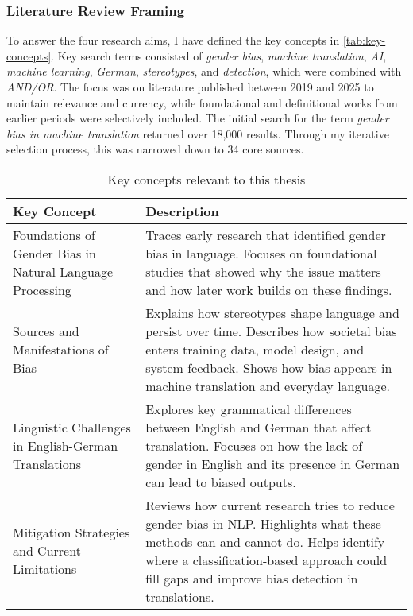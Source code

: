     \subsubsection{Literature Review Framing}
    To answer the four research aims, I have defined the key concepts in \autoref{tab:key-concepts}. Key search terms consisted of \textit{gender bias}, \textit{machine translation}, \textit{AI}, \textit{machine learning}, \textit{German}, \textit{stereotypes}, and \textit{detection}, which were combined with \textit{AND/OR}. The focus was on literature published between 2019 and 2025 to maintain relevance and currency, while foundational and definitional works from earlier periods were selectively included. The initial search for the term \textit{gender bias in machine translation} returned over 18,000 results. Through my iterative selection process, this was narrowed down to 34 core sources.

    \renewcommand{\arraystretch}{1.3}
        \begin{table}[ht!]
        \centering
        \begin{tabularx}{\textwidth}{>{\raggedright\arraybackslash}p{6.5cm}X}
        \toprule
        \textbf{Key Concept} & \textbf{Description} \\
        \midrule

        Foundations of Gender Bias in Natural Language Processing & Traces early research that identified gender bias in language. Focuses on foundational studies that showed why the issue matters and how later work builds on these findings. \\

        Sources and Manifestations of Bias & Explains how stereotypes shape language and persist over time. Describes how societal bias enters training data, model design, and system feedback. Shows how bias appears in machine translation and everyday language. \\

        Linguistic Challenges in English-German Translations & Explores key grammatical differences between English and German that affect translation. Focuses on how the lack of gender in English and its presence in German can lead to biased outputs. \\

        Mitigation Strategies and Current Limitations & Reviews how current research tries to reduce gender bias in NLP. Highlights what these methods can and cannot do. Helps identify where a classification-based approach could fill gaps and improve bias detection in translations. \\
        \bottomrule
        \end{tabularx}
        \caption{Key concepts relevant to this thesis}
        \label{tab:key-concepts}
    \end{table}


